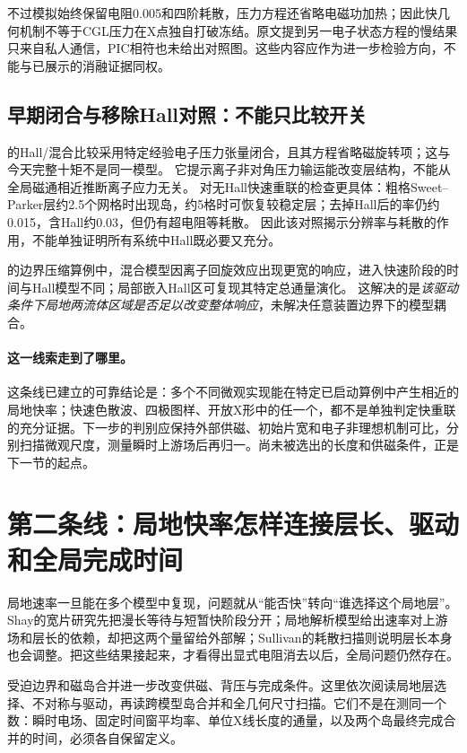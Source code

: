 \documentclass[UTF8,a4paper,11pt,openany,fontset=fandol]{ctexbook}
\begin{document}
不过模拟始终保留电阻0.005和四阶耗散，压力方程还省略电磁功加热；因此快几何机制不等于CGL压力在X点独自打破冻结。原文提到另一电子状态方程的慢结果只来自私人通信，PIC相符也未给出对照图。这些内容应作为进一步检验方向，不能与已展示的消融证据同权。

\subsection{早期闭合与移除Hall对照：不能只比较开关}
\citet{L029}的Hall/混合比较采用特定经验电子压力张量闭合，且其方程省略磁旋转项；这与今天完整十矩不是同一模型。
它提示离子非对角压力输运能改变层结构，不能从全局磁通相近推断离子应力无关。
\citet{L154}对无Hall快速重联的检查更具体：粗格Sweet--Parker层约2.5个网格时出现岛，约5格时可恢复较稳定层；去掉Hall后的率仍约0.015，含Hall约0.03，但仍有超电阻等耗散。
因此该对照揭示分辨率与耗散的作用，不能单独证明所有系统中Hall既必要又充分。

\citet{L035}的边界压缩算例中，混合模型因离子回旋效应出现更宽的响应，进入快速阶段的时间与Hall模型不同；局部嵌入Hall区可复现其特定总通量演化。
这解决的是\emph{该驱动条件下局地两流体区域是否足以改变整体响应}，未解决任意装置边界下的模型耦合。

\paragraph{这一线索走到了哪里。}这条线已建立的可靠结论是：多个不同微观实现能在特定已启动算例中产生相近的局地快率；快速色散波、四极图样、开放X形中的任一个，都不是单独判定快重联的充分证据。下一步的判别应保持外部供磁、初始片宽和电子非理想机制可比，分别扫描微观尺度，测量瞬时上游场后再归一。尚未被选出的长度和供磁条件，正是下一节的起点。

\section{第二条线：局地快率怎样连接层长、驱动和全局完成时间}\label{story:global}
局地速率一旦能在多个模型中复现，问题就从“能否快”转向“谁选择这个局地层”。Shay的宽片研究先把漫长等待与短暂快阶段分开；局地解析模型给出速率对上游场和层长的依赖，却把这两个量留给外部解；Sullivan的耗散扫描则说明层长本身也会调整。把这些结果接起来，才看得出显式电阻消去以后，全局问题仍然存在。

受迫边界和磁岛合并进一步改变供磁、背压与完成条件。这里依次阅读局地层选择、不对称与驱动，再读跨模型岛合并和全几何尺寸扫描。它们不是在测同一个数：瞬时电场、固定时间窗平均率、单位X线长度的通量，以及两个岛最终完成合并的时间，必须各自保留定义。
\end{document}
